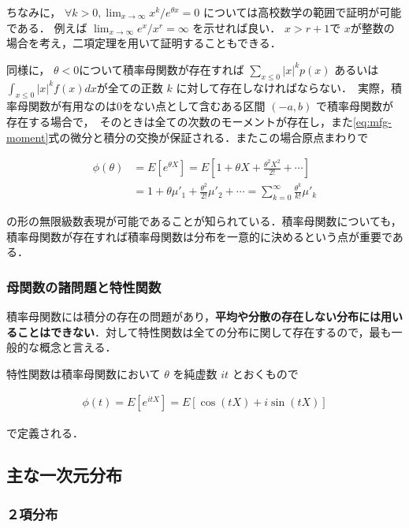 \documentclass[12pt,a4j,draft]{jarticle}
\numberwithin{equation}{section}
\theoremstyle{break}
\begin{document}
ちなみに， $\forall k > 0, \displaystyle \lim_{x \rightarrow \infty} x^k / e^{\theta x} = 0$ については高校数学の範囲で証明が可能である． 例えば $\displaystyle \lim_{x \rightarrow \infty} e^x / x^r = \infty$ を示せれば良い． $x > r+1$で $x$が整数の場合を考え，二項定理を用いて証明することもできる．

同様に， $\theta < 0$について積率母関数が存在すれば $\displaystyle \sum_{x \leq 0} |x|^k p(x)$ あるいは $\displaystyle \int_{x \leq 0} |x|^k f(x) dx$が全ての正数 $k$ に対して存在しなければならない．　実際，積率母関数が有用なのは$0$をない点として含むある区間 $(-a, b)$ で積率母関数が存在する場合で，　そのときは全ての次数のモーメントが存在し，また\eqref{eq:mfg-moment}式の微分と積分の交換が保証される．またこの場合原点まわりで 

\begin{align}
    \phi(\theta) &= E\left[ e^{\theta X} \right] = E \left[ 1 + \theta X + \frac{\theta^2 X^2}{2!} + \cdots \right] \\
    &= 1 + \theta \mu'_1 + \frac{\theta^2}{2!} \mu'_2 + \cdots = \sum_{k=0}^{\infty} \frac{\theta^k}{k!} \mu'_k
\end{align}

の形の無限級数表現が可能であることが知られている．積率母関数についても，積率母関数が存在すれば積率母関数は分布を一意的に決めるという点が重要である．

\subsubsection{母関数の諸問題と特性関数}

積率母関数には積分の存在の問題があり，\textbf{平均や分散の存在しない分布には用いることはできない}．対して特性関数は全ての分布に関して存在するので，最も一般的な概念と言える．

特性関数は積率母関数において $\theta$ を純虚数 $it$ とおくもので

\begin{align}
    \label{eq:def-characteristic-function}
    \phi(t) = E[e^{it X}] = E[\cos(tX) + i \sin(tX)]
\end{align}

で定義される．

\subsection{主な一次元分布} 

\subsubsection{２項分布}  
\end{document}
